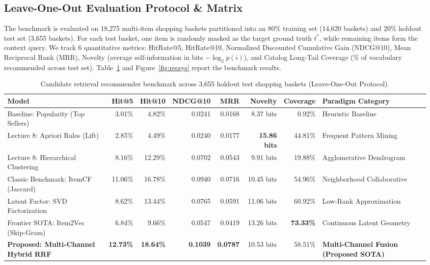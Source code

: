 \documentclass[sigconf,nonacm]{acmart}
\begin{document}
\subsection{Leave-One-Out Evaluation Protocol \& Matrix}
The benchmark is evaluated on 18,275 multi-item shopping baskets partitioned into an 80\% training set (14,620 baskets) and 20\% holdout test set (3,655 baskets). For each test basket, one item is randomly masked as the target ground truth $t^*$, while remaining items form the context query. We track 6 quantitative metrics: HitRate@5, HitRate@10, Normalized Discounted Cumulative Gain (NDCG@10), Mean Reciprocal Rank (MRR), Novelty (average self-information in bits $-\log_2 p(i)$), and Catalog Long-Tail Coverage (\% of vocabulary recommended across test set). Table~\ref{tab:matrix1} and Figure~\ref{fig:recsys} report the benchmark results.

\begin{table}[t]
\centering
\small
\caption{Candidate retrieval recommender benchmark across 3,655 holdout test shopping baskets (Leave-One-Out Protocol).}
\label{tab:matrix1}
\begin{tabular}{lrrrrrrl}
\toprule
\textbf{Model} & \textbf{Hit@5} & \textbf{Hit@10} & \textbf{NDCG@10} & \textbf{MRR} & \textbf{Novelty} & \textbf{Coverage} & \textbf{Paradigm Category} \\
\midrule
Baseline: Popularity (Top Sellers) & 3.01\% & 4.82\% & 0.0241 & 0.0168 & 8.37 bits & 0.92\% & Heuristic Baseline \\
Lecture 8: Apriori Rules (Lift) & 2.85\% & 4.49\% & 0.0240 & 0.0177 & \textbf{15.86 bits} & 44.81\% & Frequent Pattern Mining \\
Lecture 8: Hierarchical Clustering & 8.16\% & 12.29\% & 0.0702 & 0.0543 & 9.91 bits & 19.88\% & Agglomerative Dendrogram \\
Classic Benchmark: ItemCF (Jaccard) & 11.06\% & 16.78\% & 0.0940 & 0.0716 & 10.45 bits & 54.96\% & Neighborhood Collaborative \\
Latent Factor: SVD Factorization & 8.62\% & 13.44\% & 0.0765 & 0.0591 & 11.06 bits & 60.92\% & Low-Rank Approximation \\
Frontier SOTA: Item2Vec (Skip-Gram) & 6.84\% & 9.66\% & 0.0547 & 0.0419 & 13.26 bits & \textbf{73.33\%} & Continuous Latent Geometry \\
\textbf{Proposed: Multi-Channel Hybrid RRF} & \textbf{12.73\%} & \textbf{18.64\%} & \textbf{0.1039} & \textbf{0.0787} & 10.53 bits & 58.51\% & \textbf{Multi-Channel Fusion (Proposed SOTA)} \\
\bottomrule
\end{tabular}
\end{table}
\end{document}
